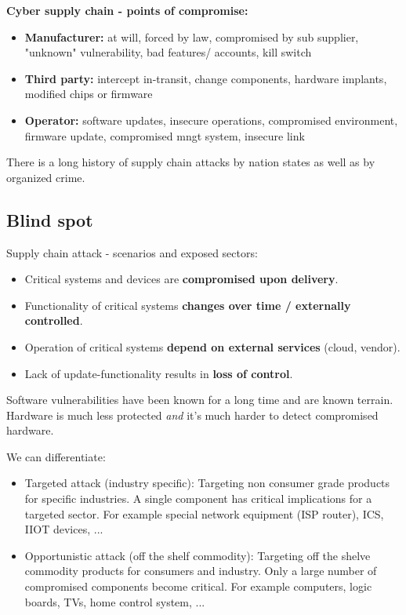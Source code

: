 \documentclass[11pt,oneside,a4paper]{article}
\begin{document}
\textbf{Cyber supply chain - points of compromise:}

\vspace{-\topsep}
\begin{itemize}
	\setlength{\itemsep}{0pt}
	\setlength{\parskip}{0pt}
	\item \textbf{Manufacturer:} at will, forced by law, compromised by sub supplier, "unknown" vulnerability, bad features/ accounts, kill switch
	\item \textbf{Third party:} intercept in-transit, change components, hardware implants, modified chips or firmware
	\item \textbf{Operator:} software updates, insecure operations, compromised environment, firmware update, compromised mngt system, insecure link
\end{itemize}
\vspace{-\topsep}

There is a long history of supply chain attacks by nation states as well as by organized crime.

\subsection{Blind spot}

Supply chain attack - scenarios and exposed sectors:

\vspace{-\topsep}
\begin{itemize}
	\setlength{\itemsep}{0pt}
	\setlength{\parskip}{0pt}
	\item Critical systems and devices are \textbf{compromised upon delivery}.
	\item Functionality of critical systems \textbf{changes over time / externally controlled}.
	\item Operation of critical systems \textbf{depend on external services} (cloud, vendor).
	\item Lack of update-functionality results in \textbf{loss of control}.
\end{itemize}
\vspace{-\topsep}

Software vulnerabilities have been known for a long time and are known terrain. Hardware is much less protected \textit{and} it's much harder to detect compromised hardware.

We can differentiate:

\vspace{-\topsep}
\begin{itemize}
	\setlength{\itemsep}{0pt}
	\setlength{\parskip}{0pt}
	\item Targeted attack (industry specific): Targeting non consumer grade products for specific industries. A single component has critical implications for a targeted sector. For example special network equipment (ISP router), ICS, IIOT devices, ...
	\item Opportunistic attack (off the shelf commodity): Targeting off the shelve commodity products for consumers and industry. Only a large number of compromised components become critical. For example computers, logic boards, TVs, home control system, ...
\end{itemize}
\vspace{-\topsep}
\end{document}
